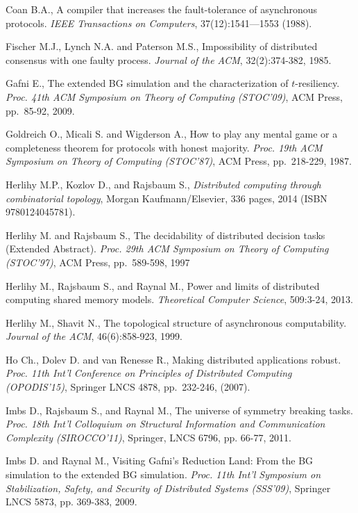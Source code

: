 \documentclass[11pt,letterpaper]{article}
\begin{document}
\begin{thebibliography}{99}
{
Coan B.A.,
A compiler that increases the fault-tolerance of asynchronous protocols. 
{\it IEEE Transactions on Computers}, 37(12):1541—1553 (1988).


Fischer M.J., Lynch N.A. and Paterson M.S.,
Impossibility of distributed consensus with one faulty process.
{\em Journal of the ACM}, 32(2):374-382, 1985.


Gafni E.,
The extended BG simulation and the characterization of $t$-resiliency.
{\em Proc. 41th ACM  Symposium on Theory of Computing (STOC'09)},
ACM Press,  pp.~85-92,  2009.

Goldreich O., Micali S. and Wigderson A.,
How to play any mental game or a completeness theorem for 
protocols with honest majority.
{\em Proc. 19th ACM  Symposium on Theory of Computing (STOC'87)},
ACM Press,  pp.~218-229,  1987.



Herlihy M.P.,  Kozlov D., and  Rajsbaum S.,
{\it Distributed computing  through combinatorial topology},
Morgan Kaufmann/Elsevier,  336 pages,  2014
(ISBN 9780124045781).

Herlihy M. and Rajsbaum S.,
The decidability of distributed decision tasks (Extended Abstract).
{\it Proc.  29th ACM Symposium on Theory of Computing (STOC'97)},
 ACM Press, pp.~589-598, 1997


Herlihy M.,  Rajsbaum S., and Raynal M.,
 Power and limits of distributed computing shared memory models.
{\it  Theoretical  Computer  Science},  509:3-24, 2013.

Herlihy M., Shavit N.,
The topological structure of asynchronous computability.
{\it Journal of the  ACM}, 46(6):858-923, 1999.

Ho Ch.,  Dolev D. and  van Renesse R., 
Making distributed applications robust.
{\it Proc. 11th Int'l Conference on Principles of Distributed Computing
(OPODIS'15)}, Springer LNCS 4878, pp.~232-246, (2007). 

Imbs D., Rajsbaum S., and Raynal M.,
 The universe of symmetry breaking tasks.
{\it Proc.  18th Int'l Colloquium on Structural Information and
Communication Complexity (SIROCCO'11)}, Springer, LNCS 6796, pp. 66-77, 2011.



Imbs D. and Raynal M.,
Visiting Gafni's Reduction Land:
From the BG simulation to the extended BG simulation.
{\it Proc. 11th  Int'l Symposium on Stabilization, Safety, and Security
of Distributed Systems (SSS'09)}, Springer LNCS 5873, pp. 369-383, 2009.


}
\end{thebibliography}
\end{document}
